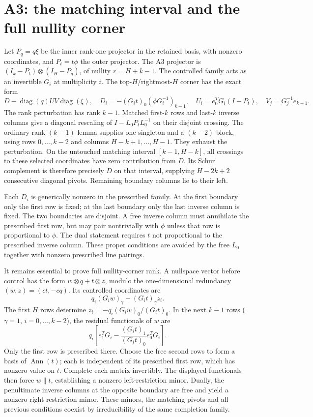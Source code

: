 \documentclass[11pt]{article}
\begin{document}
\section{A3: the matching interval and the full nullity corner}
Let $P_q=q\xi$ be the inner rank-one projector in the retained basis, with nonzero coordinates, and $P_t=t\phi$ the outer projector. The A3 projector is $(I_k-P_t)\otimes(I_H-P_q)$, of nullity $r=H+k-1$. The controlled family acts as an invertible $G_i$ at multiplicity $i$. The top-$H$/rightmost-$H$ corner has the exact form
\[
D-\operatorname{diag}(q)UV\operatorname{diag}(\xi),\quad
D_i=-(G_it)_0(\phi G_i^{-1})_{k-1},\quad
U_i=e_0^TG_i(I-P_t),\quad V_j=G_j^{-1}e_{k-1}.
\]
The rank perturbation has rank $k-1$. Matched first-$k$ rows and last-$k$ inverse columns give a diagonal rescaling of $I-L_0P_tL_0^{-1}$ on their disjoint crossing. The ordinary rank-$(k-1)$ lemma supplies one singleton and a $(k-2)$-block, using rows $0,\ldots,k-2$ and columns $H-k+1,\ldots,H-1$. They exhaust the perturbation. On the untouched matching interval $[k-1,H-k]$, all crossings to these selected coordinates have zero contribution from $D$. Its Schur complement is therefore precisely $D$ on that interval, supplying $H-2k+2$ consecutive diagonal pivots. Remaining boundary columns lie to their left.

Each $D_i$ is generically nonzero in the prescribed family. At the first boundary only the first row is fixed; at the last boundary only the last inverse column is fixed. The two boundaries are disjoint. A free inverse column must annihilate the prescribed first row, but may pair nontrivially with $\phi$ unless that row is proportional to $\phi$. The dual statement requires $t$ not proportional to the prescribed inverse column. These proper conditions are avoided by the free $L_0$ together with nonzero prescribed line pairings.

It remains essential to prove full nullity-corner rank. A nullspace vector before control has the form $w\otimes q+t\otimes z$, modulo the one-dimensional redundancy $(w,z)=(ct,-cq)$. Its controlled coordinates are
\[
q_i(G_iw)_\gamma+(G_it)_\gamma z_i.
\]
The first $H$ rows determine $z_i=-q_i(G_iw)_0/(G_it)_0$. In the next $k-1$ rows ($\gamma=1$, $i=0,\ldots,k-2$), the residual functionals of $w$ are
\[
q_i\left[e_1^TG_i-\frac{(G_it)_1}{(G_it)_0}e_0^TG_i\right].
\]
Only the first row is prescribed there. Choose the free second rows to form a basis of $\operatorname{Ann}(t)$; each is independent of its prescribed first row, which has nonzero value on $t$. Complete each matrix invertibly. The displayed functionals then force $w\parallel t$, establishing a nonzero left-restriction minor. Dually, the penultimate inverse columns at the opposite boundary are free and yield a nonzero right-restriction minor. These minors, the matching pivots and all previous conditions coexist by irreducibility of the same completion family.
\end{document}
